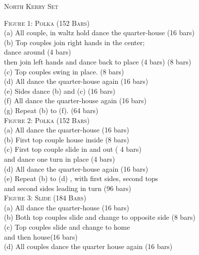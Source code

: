 \begin{center}
\textsc{North Kerry Set} \\
\end{center}


\small \textsc{Figure 1: Polka (152 Bars)}\\


\bodyText
(a) All couple, in waltz hold dance the quarter-house \hfill(16 bars)\\
(b) Top couples join right hands in the center; \\
dance around (4 bars)\\
then join left hands and dance back to place (4 bars) \hfill(8 bars)\\
(c) Top couples swing in place. \hfill (8 bars)\\
(d) All dance the quarter-house again \hfill(16 bars) \\
(e) Sides dance (b) and (c) \hfill(16 bars)\\
(f) All dance the quarter-house again \hfill(16 bars) \\
(g) Repeat (b) to (f). \hfill(64 bars)\\

\small \textsc{Figure 2: Polka (152 Bars)}\\

\bodyText
(a) All dance the quarter-house \hfill(16 bars) \\
(b) First top couple house inside \hfill(8 bars) \\
(c) First top couple slide in and out ( 4 bars) \\
 and dance one turn in place \hfill(4 bars)\\
(d) All dance the quarter-house again \hfill(16 bars)\\
(e) Repeat (b) to (d) , with  first sides, 
 second tops \\and second sides leading in turn \hfill (96 bars)\\

\small \textsc{Figure 3: Slide (184 Bars)}\\

\bodyText
(a) All dance the quarter-house \hfill(16 bars) \\
(b) Both top couples slide and change to opposite side (8 bars)\\
(c) Top couples slide and change to home \\
 and then house\hfill (16 bars) \\
(d) All couples dance the quarter house again \hfill(16 bars)\\

